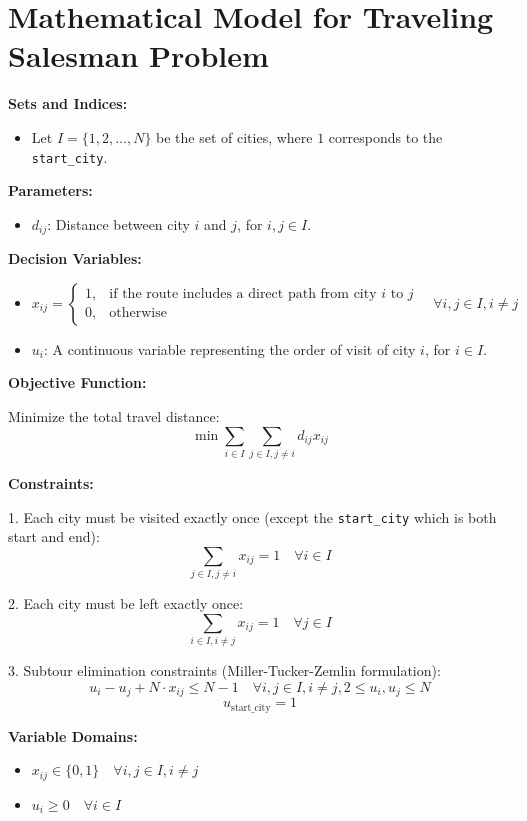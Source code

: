 \documentclass{article}
\begin{document}
\section*{Mathematical Model for Traveling Salesman Problem}

\textbf{Sets and Indices:}
\begin{itemize}
    \item Let $I = \{ 1, 2, \ldots, N \}$ be the set of cities, where $1$ corresponds to the \texttt{start\_city}.
\end{itemize}

\textbf{Parameters:}
\begin{itemize}
    \item $d_{ij}$: Distance between city $i$ and $j$, for $i, j \in I$.
\end{itemize}

\textbf{Decision Variables:}
\begin{itemize}
    \item $x_{ij} = 
    \begin{cases} 
    1, & \text{if the route includes a direct path from city $i$ to $j$} \\ 
    0, & \text{otherwise} 
    \end{cases} \quad \forall i, j \in I, i \neq j$
    \item $u_i$: A continuous variable representing the order of visit of city $i$, for $i \in I$.
\end{itemize}

\textbf{Objective Function:}

Minimize the total travel distance:
\[
\min \sum_{i \in I}\sum_{j \in I, j \neq i} d_{ij} x_{ij}
\]

\textbf{Constraints:}

1. Each city must be visited exactly once (except the \texttt{start\_city} which is both start and end):
\[
\sum_{j \in I, j \neq i} x_{ij} = 1 \quad \forall i \in I
\]

2. Each city must be left exactly once:
\[
\sum_{i \in I, i \neq j} x_{ij} = 1 \quad \forall j \in I
\]

3. Subtour elimination constraints (Miller-Tucker-Zemlin formulation):
\[
u_i - u_j + N \cdot x_{ij} \leq N - 1 \quad \forall i, j \in I, i \neq j, 2 \leq u_i, u_j \leq N
\]
\[
u_{\text{start\_city}} = 1
\]

\textbf{Variable Domains:}
\begin{itemize}
    \item $x_{ij} \in \{0, 1\} \quad \forall i, j \in I, i \neq j$
    \item $u_i \geq 0 \quad \forall i \in I$
\end{itemize}
\end{document}
